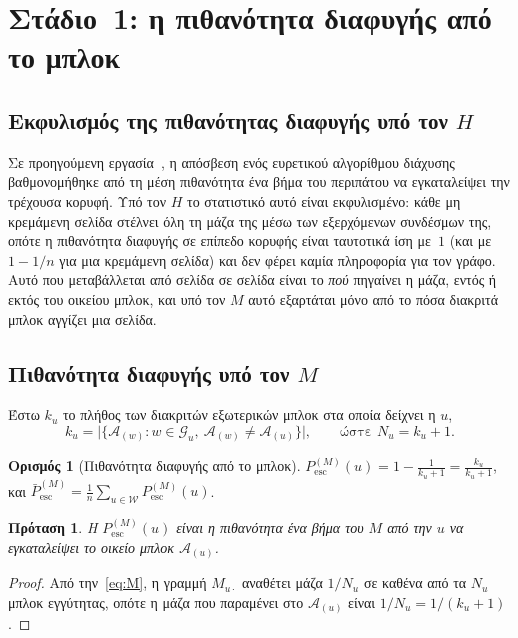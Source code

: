 \documentclass[11pt,a4paper]{article}
\newtheorem{proposition}{Πρόταση}
\theoremstyle{definition}
\newtheorem{definition}{Ορισμός}
\theoremstyle{remark}
\newcommand{\Pesc}{P^{(M)}_{\mathrm{esc}}}
\newcommand{\Pbar}{\bar P^{(M)}_{\mathrm{esc}}}
\begin{document}
\section{Στάδιο~1: η πιθανότητα διαφυγής από το μπλοκ}
\label{sec:stage1}

\subsection{Εκφυλισμός της πιθανότητας διαφυγής υπό τον \texorpdfstring{$H$}{H}}
Σε προηγούμενη εργασία~\cite{konstantellos26}, η απόσβεση ενός ευρετικού αλγορίθμου διάχυσης
βαθμονομήθηκε από τη μέση πιθανότητα ένα βήμα του περιπάτου να εγκαταλείψει την τρέχουσα κορυφή. Υπό
τον $H$ το στατιστικό αυτό είναι εκφυλισμένο: κάθε μη κρεμάμενη σελίδα στέλνει όλη τη μάζα της μέσω
των εξερχόμενων συνδέσμων της, οπότε η πιθανότητα διαφυγής σε επίπεδο κορυφής είναι ταυτοτικά ίση
με~$1$ (και με $1-1/n$ για μια κρεμάμενη σελίδα) και δεν φέρει καμία πληροφορία για τον γράφο. Αυτό που
μεταβάλλεται από σελίδα σε σελίδα είναι το \emph{πού} πηγαίνει η μάζα, εντός ή εκτός του οικείου
μπλοκ, και υπό τον $M$ αυτό εξαρτάται μόνο από το πόσα διακριτά μπλοκ αγγίζει μια σελίδα.

\subsection{Πιθανότητα διαφυγής υπό τον \texorpdfstring{$M$}{M}}
Έστω $k_u$ το πλήθος των διακριτών εξωτερικών μπλοκ στα οποία δείχνει η $u$,
\[
k_u=\bigl|\{\mathcal A_{(w)}:w\in\mathcal G_u,\ \mathcal A_{(w)}\ne\mathcal A_{(u)}\}\bigr|,
\qquad\text{ώστε } N_u=k_u+1 .
\]

\begin{definition}[Πιθανότητα διαφυγής από το μπλοκ]
$\Pesc(u)=1-\frac{1}{k_u+1}=\frac{k_u}{k_u+1}$, και $\Pbar=\frac1n\sum_{u\in\mathcal W}\Pesc(u)$.
\end{definition}

\begin{proposition}\label{prop:esc}
Η $\Pesc(u)$ είναι η πιθανότητα ένα βήμα του $M$ από την $u$ να εγκαταλείψει το οικείο μπλοκ
$\mathcal A_{(u)}$.
\end{proposition}
\begin{proof}
Από την~\eqref{eq:M}, η γραμμή $M_{u\cdot}$ αναθέτει μάζα $1/N_u$ σε καθένα από τα $N_u$ μπλοκ
εγγύτητας, οπότε η μάζα που παραμένει στο $\mathcal A_{(u)}$ είναι $1/N_u=1/(k_u+1)$.
\end{proof}
\end{document}
